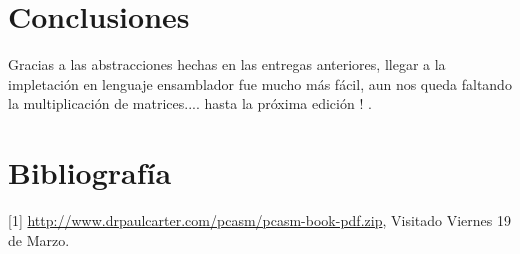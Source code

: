 \documentclass[conference]{IEEEtran}
\begin{document}
%
%


%



\section{Conclusiones}
Gracias a las abstracciones hechas en las entregas anteriores, llegar a la
impletaci\'on en lenguaje ensamblador fue mucho m\'as f\'acil, aun nos queda faltando
la multiplicaci\'on de matrices....   hasta la pr\'oxima edici\'on ! .


\section{Bibliograf\'ia}
[1] \url{http://www.drpaulcarter.com/pcasm/pcasm-book-pdf.zip}, Visitado Viernes 19 de Marzo.





\end{document}
